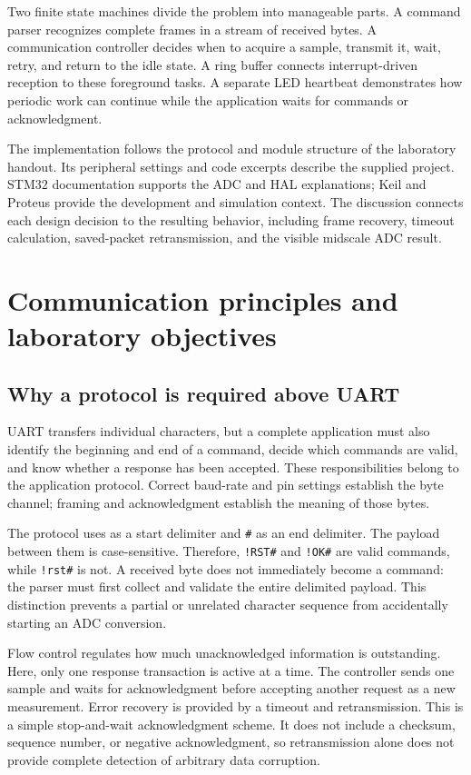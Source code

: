 \documentclass[a4paper]{article}
\newcommand{\code}[1]{\texttt{\detokenize{#1}}}
\newcommand{\topic}[1]{\subsection{#1}}
\begin{document}
Two finite state machines divide the problem into manageable parts. A command
parser recognizes complete frames in a stream of received bytes. A communication
controller decides when to acquire a sample, transmit it, wait, retry, and return
to the idle state. A ring buffer connects interrupt-driven reception to these
foreground tasks. A separate LED heartbeat demonstrates how periodic work can
continue while the application waits for commands or acknowledgment.

The implementation follows the protocol and module structure of the laboratory
handout\cite{lab}. Its peripheral settings and code excerpts describe the supplied
project. STM32 documentation supports the ADC and HAL explanations\cite{stm32,hal};
Keil and Proteus provide the development and simulation context\cite{keil,proteus}.
The discussion connects each design decision to the resulting behavior, including
frame recovery, timeout calculation, saved-packet retransmission, and the visible
midscale ADC result.


\section{Communication principles and laboratory objectives}

\topic{Why a protocol is required above UART}

UART transfers individual characters, but a complete application must also
identify the beginning and end of a command, decide which commands are valid,
and know whether a response has been accepted. These responsibilities belong
to the application protocol. Correct baud-rate and pin settings establish the
byte channel; framing and acknowledgment establish the meaning of those bytes.

The protocol uses \code{!} as a start delimiter and \texttt{\#} as an end delimiter.
The payload between them is case-sensitive. Therefore, \texttt{!RST\#} and
\texttt{!OK\#} are valid commands, while \texttt{!rst\#} is not. A received byte does
not immediately become a command: the parser must first collect and validate
the entire delimited payload. This distinction prevents a partial or unrelated
character sequence from accidentally starting an ADC conversion.

Flow control regulates how much unacknowledged information is outstanding.
Here, only one response transaction is active at a time. The controller sends
one sample and waits for acknowledgment before accepting another request as
a new measurement. Error recovery is provided by a timeout and retransmission.
This is a simple stop-and-wait acknowledgment scheme. It does not include a
checksum, sequence number, or negative acknowledgment, so retransmission alone
does not provide complete detection of arbitrary data corruption.
\end{document}
